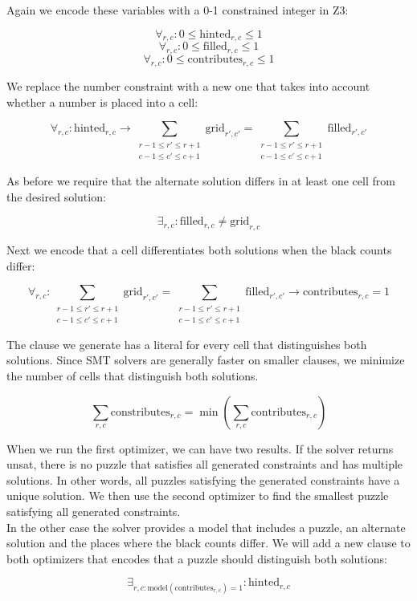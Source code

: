 \documentclass{scrartcl}
\begin{document}
	Again we encode these variables with a 0-1 constrained integer in Z3:

	$$\forall_{r,c}: 0\le \text{hinted}_{r,c} \le 1$$
	$$\forall_{r,c}: 0\le \text{filled}_{r,c} \le 1$$
	$$\forall_{r,c}: 0\le \text{contributes}_{r,c} \le 1$$

	We replace the number constraint with a new one that takes into account whether a number is placed into a cell:

	$$\forall_{r,c}: \text{hinted}_{r,c}\to\sum_{\substack{r-1\le r' \le r+1\\c-1\le c'\le c+1}}\text{grid}_{r',c'} = \sum_{\substack{r-1\le r' \le r+1\\c-1\le c'\le c+1}}\text{filled}_{r',c'}$$

	As before we require that the alternate solution differs in at least one cell from the desired solution:

	$$\exists_{r,c}:  \text{filled}_{r,c} \ne \text{grid}_{r,c}$$

	Next we encode that a cell differentiates both solutions when the black counts differ:

	$$\forall_{r,c}: \sum_{\substack{r-1\le r' \le r+1\\c-1\le c'\le c+1}}\text{grid}_{r',c'} = \sum_{\substack{r-1\le r' \le r+1\\c-1\le c'\le c+1}}\text{filled}_{r',c'}\to \text{contributes}_{r,c}=1$$

	The clause we generate has a literal for every cell that distinguishes both solutions. Since SMT solvers are generally faster on smaller clauses, we minimize the number of cells that distinguish both solutions.

	$$\sum_{r,c}\text{constributes}_{r,c} = \min_{}(\sum_{r,c}\text{contributes}_{r,c}
	)$$

	When we run the first optimizer, we can have two results.
	If the solver returns unsat, there is no puzzle that satisfies all generated constraints and has multiple solutions. In other words, all puzzles satisfying the generated constraints have a unique solution. We then use the second optimizer to find the smallest puzzle satisfying all generated constraints.\\

	In the other case the solver provides a model that includes a puzzle, an alternate solution and the places where the black counts differ. We will add a new clause to both optimizers that encodes that a puzzle should distinguish both solutions:

	$$\exists_{r,c : \text{model}(\text{contributes}_{r,c})=1}: \text{hinted}_{r,c}$$
\end{document}
